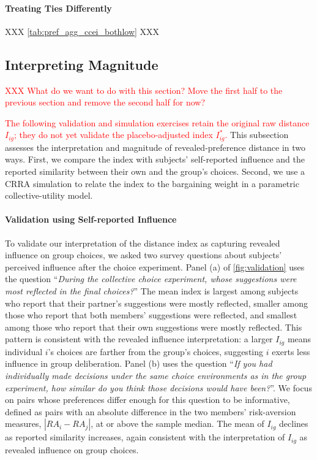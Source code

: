 \documentclass[11 pt]{article}
\begin{document}
\paragraph{Treating Ties Differently} XXX \autoref{tab:pref_agg_ccei_bothlow} XXX

\subsection{Interpreting Magnitude}\label{subsec:magnitude}
\textcolor{red}{XXX What do we want to do with this section? Move the first half to the previous section and remove the second half for now?}

\textcolor{red}{The following validation and simulation exercises retain the original raw distance $I_{ig}$; they do not yet validate the placebo-adjusted index $I^*_{ig}$.} This subsection assesses the interpretation and magnitude of revealed-preference distance in two ways. First, we compare the index with subjects' self-reported influence and the reported similarity between their own and the group's choices. Second, we use a CRRA simulation to relate the index to the bargaining weight in a parametric collective-utility model.


\paragraph{Validation using Self-reported Influence}\label{subsection:validation} To validate our interpretation of the distance index as capturing revealed influence on group choices, we asked two survey questions about subjects' perceived influence after the choice experiment. Panel (a) of \autoref{fig:validation} uses the question ``\textit{During the collective choice experiment, whose suggestions were most reflected in the final choices?}'' The mean index is largest among subjects who report that their partner's suggestions were mostly reflected, smaller among those who report that both members' suggestions were reflected, and smallest among those who report that their own suggestions were mostly reflected. This pattern is consistent with the revealed influence interpretation: a larger $I_{ig}$ means individual $i$'s choices are farther from the group's choices, suggesting $i$ exerts less influence in group deliberation. Panel (b) uses the question ``\textit{If you had individually made decisions under the same choice environments as in the group experiment, how similar do you think those decisions would have been?}''. We focus on pairs whose preferences differ enough for this question to be informative, defined as pairs with an absolute difference in the two members' risk-aversion measures, $|RA_i-RA_j|$, at or above the sample median. The mean of $I_{ig}$ declines as reported similarity increases, again consistent with the interpretation of $I_{ig}$ as revealed influence on group choices.
\end{document}
